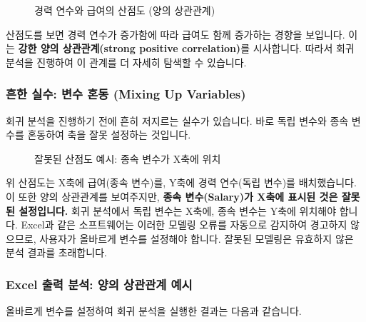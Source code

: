 \documentclass[11pt,a4paper]{book}
\theoremstyle{definition}
\begin{document}
\begin{figure}[h!]
    \centering
    \caption{경력 연수와 급여의 산점도 (양의 상관관계)}
    \label{fig:positive_correlation_scatter}
\end{figure}
\begin{tcolorbox}[colback=lightblue,colframe=darkblue,title={산점도 분석: 양의 상관관계}]
산점도를 보면 경력 연수가 증가함에 따라 급여도 함께 증가하는 경향을 보입니다. 이는 \textbf{강한 양의 상관관계(strong positive correlation)}를 시사합니다. 따라서 회귀 분석을 진행하여 이 관계를 더 자세히 탐색할 수 있습니다.
\end{tcolorbox}

\subsubsection{흔한 실수: 변수 혼동 (Mixing Up Variables)}
회귀 분석을 진행하기 전에 흔히 저지르는 실수가 있습니다. 바로 독립 변수와 종속 변수를 혼동하여 축을 잘못 설정하는 것입니다.

\begin{figure}[h!]
    \centering
    \caption{잘못된 산점도 예시: 종속 변수가 X축에 위치}
    \label{fig:wrong_scatter_plot}
\end{figure}
\begin{cautionbox}
위 산점도는 X축에 급여(종속 변수)를, Y축에 경력 연수(독립 변수)를 배치했습니다. 이 또한 양의 상관관계를 보여주지만, \textbf{종속 변수(Salary)가 X축에 표시된 것은 잘못된 설정입니다.} 회귀 분석에서 독립 변수는 X축에, 종속 변수는 Y축에 위치해야 합니다. Excel과 같은 소프트웨어는 이러한 모델링 오류를 자동으로 감지하여 경고하지 않으므로, 사용자가 올바르게 변수를 설정해야 합니다. 잘못된 모델링은 유효하지 않은 분석 결과를 초래합니다.
\end{cautionbox}

\subsubsection{Excel 출력 분석: 양의 상관관계 예시}
올바르게 변수를 설정하여 회귀 분석을 실행한 결과는 다음과 같습니다.
\end{document}
